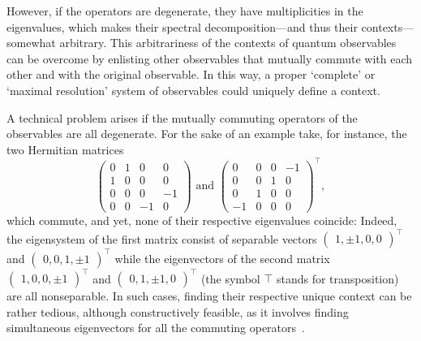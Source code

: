 \documentclass[
  twocolumn,
 showpacs,
 showkeys,
 preprintnumbers,
 amsmath,amssymb,
 aps,
 pra,
  longbibliography,
 floatfix,
 ]{revtex4-2}
\begin{document}



However, if the operators are degenerate, they have multiplicities in the eigenvalues,
which makes their spectral decomposition---and thus their contexts---somewhat arbitrary.
This arbitrariness of the contexts of quantum observables can be overcome
by enlisting other observables that mutually commute with each other and with the original observable.
In this way, a proper `complete' or `maximal resolution' system of observables could uniquely define a context.


A technical problem arises if the mutually commuting operators of the observables are all degenerate.
For the sake of an example take, for instance, the two Hermitian matrices
\[
\begin{pmatrix}
0 &  1 &  0 &  0 \\  1 &  0 &  0 &  0 \\  0 &  0 &  0 &  -1 \\  0 &  0 &  -1 &  0
\end{pmatrix}
\text{ and }
\begin{pmatrix}
0 &  0 &  0 &  -1 \\  0 &  0 &  1 &  0 \\  0 &  1 &  0 &  0 \\  -1 &  0 &  0 &  0
\end{pmatrix}^\intercal,
\]
which commute, and yet, none of their respective eigenvalues coincide: Indeed, the eigensystem of the first matrix consist of separable vectors
$
\begin{pmatrix}
1 ,  \pm 1 ,  0 , 0
\end{pmatrix}^\intercal
$
and
$
\begin{pmatrix}
 0 , 0  , 1 ,  \pm 1
\end{pmatrix}^\intercal
$
while
the eigenvectors of the second matrix
$
\begin{pmatrix}
1  ,  0 , 0 ,  \pm 1
\end{pmatrix}^\intercal
$
and
$
\begin{pmatrix}
 0  , 1 ,  \pm 1 , 0
\end{pmatrix}^\intercal
$
(the symbol $\intercal$ stands for transposition)
 are all nonseparable.
In such cases, finding their respective unique context can be rather tedious, although constructively feasible,
as it involves finding simultaneous eigenvectors for all the commuting operators~\cite[Section 1.3]{Horn-Johnson-MatrixAnalysis}.
\end{document}
